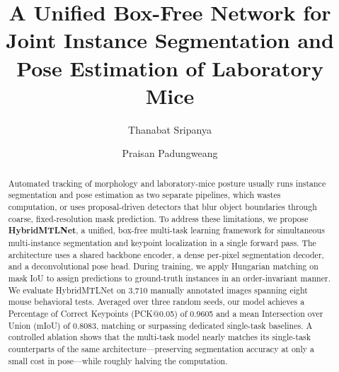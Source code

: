 \documentclass[runningheads]{llncs}
\begin{document}
\title{A Unified Box-Free Network for Joint Instance Segmentation
and Pose Estimation of Laboratory Mice}


\author{Thanabat Sripanya \and
Praisan Padungweang}



\maketitle

\begin{abstract}
Automated tracking of morphology and laboratory-mice posture usually
runs instance segmentation and pose estimation as two separate
pipelines, which wastes computation, or uses proposal-driven detectors
that blur object boundaries through coarse, fixed-resolution mask prediction. To address these
limitations, we propose \textbf{HybridMTLNet}, a unified, box-free
multi-task learning framework for simultaneous multi-instance
segmentation and keypoint localization in a single forward pass. The
architecture uses a shared backbone encoder, a dense per-pixel
segmentation decoder, and a deconvolutional pose head. During training,
we apply Hungarian matching on mask IoU to assign predictions to
ground-truth instances in an order-invariant manner. We evaluate
HybridMTLNet on 3{,}710 manually annotated images spanning eight mouse
behavioral tests. Averaged over three random seeds, our model achieves
a Percentage of Correct Keypoints (PCK@0.05) of 0.9605 and a mean
Intersection over Union (mIoU) of 0.8083, matching or surpassing
dedicated single-task baselines. A controlled ablation shows that the
multi-task model nearly matches its single-task counterparts of the
same architecture---preserving segmentation accuracy at only a small
cost in pose---while roughly halving the computation.
\end{abstract}
\end{document}

